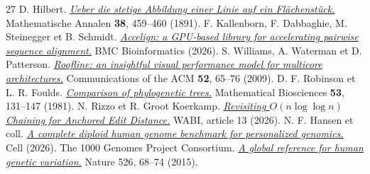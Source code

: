 \begin{thebibliography}{27}
 D. Hilbert. \href{https://doi.org/10.1007/BF01199431}{\emph{Ueber die stetige Abbildung einer Linie auf ein Flächenstück.}} Mathematische Annalen \textbf{38}, 459--460 (1891).
 F. Kallenborn, F. Dabbaghie, M. Steinegger et B. Schmidt. \href{https://doi.org/10.1186/s12859-026-06521-0}{\emph{Accelign: a GPU-based library for accelerating pairwise sequence alignment.}} BMC Bioinformatics (2026).
 S. Williams, A. Waterman et D. Patterson. \href{https://doi.org/10.1145/1498765.1498785}{\emph{Roofline: an insightful visual performance model for multicore architectures.}} Communications of the ACM \textbf{52}, 65--76 (2009).
 D. F. Robinson et L. R. Foulds. \href{https://doi.org/10.1016/0025-5564(81)90043-2}{\emph{Comparison of phylogenetic trees.}} Mathematical Biosciences \textbf{53}, 131--147 (1981).
 N. Rizzo et R. Groot Koerkamp. \href{https://doi.org/10.4230/LIPIcs.WABI.2026.13}{\emph{Revisiting \(O(n\log\log n)\) Chaining for Anchored Edit Distance.}} WABI, article 13 (2026).
 N. F. Hansen et coll. \href{https://doi.org/10.1016/j.cell.2026.06.016}{\emph{A complete diploid human genome benchmark for personalized genomics.}} Cell (2026).
 The 1000 Genomes Project Consortium. \href{https://doi.org/10.1038/nature15393}{\emph{A global reference for human genetic variation.}} Nature 526, 68--74 (2015).
\end{thebibliography}
